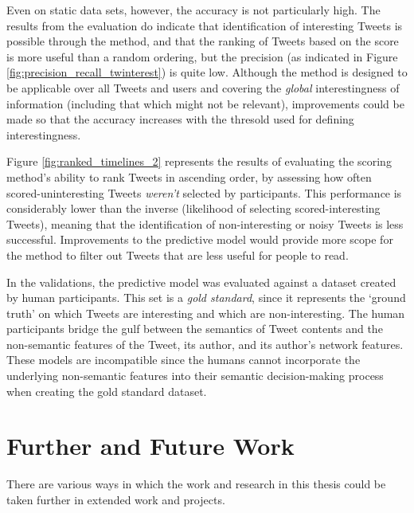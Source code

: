 Even on static data sets, however, the accuracy is not particularly high. The results from the evaluation do indicate that identification of interesting Tweets is possible through the method, and that the ranking of Tweets based on the score is more useful than a random ordering, but the precision (as indicated in Figure \ref{fig:precision_recall_twinterest}) is quite low. Although the method is designed to be applicable over all Tweets and users and covering the \textit{global} interestingness of information (including that which might not be relevant), improvements could be made so that the accuracy increases with the thresold used for defining interestingness.

Figure \ref{fig:ranked_timelines_2} represents the results of evaluating the scoring method's ability to rank Tweets in ascending order, by assessing how often scored-uninteresting Tweets \textit{weren't} selected by participants. This performance is considerably lower than the inverse (likelihood of selecting scored-interesting Tweets), meaning that the identification of non-interesting or noisy Tweets is less successful. Improvements to the predictive model would provide more scope for the method to filter out Tweets that are less useful for people to read.

In the validations, the predictive model was evaluated against a dataset created by human participants. This set is a \textit{gold standard}, since it represents the `ground truth' on which Tweets are interesting and which are non-interesting. The human participants bridge the gulf between the semantics of Tweet contents and the non-semantic features of the Tweet, its author, and its author's network features. These models are incompatible since the humans cannot incorporate the underlying non-semantic features into their semantic decision-making process when creating the gold standard dataset.

\section{Further and Future Work}
There are various ways in which the work and research in this thesis could be taken further in extended work and projects.



